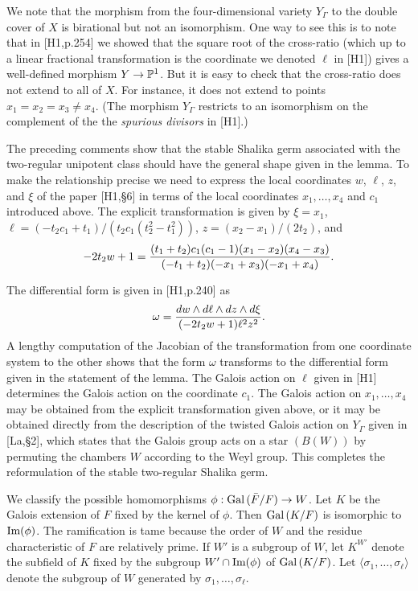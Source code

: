 We note that the morphism from the four-dimensional variety $Y_\Gamma$ to
the double cover of $X$ is birational but not an isomorphism.  One
way to see this is to note that in [H1,p.254] we showed that the 
square root of the cross-ratio
(which up to a linear fractional transformation is the coordinate
we denoted $\ell$ in [H1]) gives a well-defined morphism $Y\to\P^1$.
But it is easy to check that the cross-ratio does not extend to all of
$X$.  For instance, it does not extend to points $x_1=x_2=x_3\ne x_4$.
(The morphism $Y_\Gamma$ restricts to an isomorphism
on the complement of the
the {\it spurious divisors} in [H1].)

The preceding comments show
that the stable Shalika germ associated with the two-regular
unipotent class should have the general shape given in the lemma.
To make the relationship precise we need to express the local
coordinates $w$, $\ell$, $z$, and $\xi$ of the paper [H1,\S6] in terms
of the local coordinates $x_1,\ldots,x_4$ and $c_1$ introduced above.
The explicit transformation is given by $\xi=x_1$, $\ell =
(-t_2 c_1 + t_1)/(t_2 c_1 (t_2^2-t_1^2))$, $z= (x_2-x_1)/(2 t_2)$,
and 
$$-2 t_2 w + 1 = {(t_1+t_2) c_1 (c_1-1) (x_1-x_2) (x_4-x_3)  
                \over (-t_1+t_2)(-x_1+x_3)(-x_1+x_4)}.$$

The differential form is given in [H1,p.240] as
$$\omega = {dw\wedge d\ell\wedge dz\wedge d\xi\over
 (-2t_2 w + 1) \ell^2 z^2}.$$
A lengthy computation of the Jacobian of the transformation
from one coordinate system to the other shows that the form $\omega$
transforms to the differential form given in the statement of the lemma.
The Galois action on $\ell$ given in [H1] determines the Galois action
on the coordinate $c_1$.  The Galois action on $x_1,\ldots,x_4$ may
be obtained from the explicit transformation given above, or it may
be obtained directly from the description of the twisted Galois action
on $Y_\Gamma$ given in [La,\S2], 
which states that the Galois group acts on a 
star $(B(W))$ by permuting the chambers $W$ according to the Weyl group.
This completes the reformulation of the
stable two-regular Shalika germ.\hfill \x

\bigskip
We classify the possible homomorphisms $\phi:\Gal(\bF/F)\to W$.
Let $K$
be the Galois extension of $F$ fixed by the kernel of $\phi$.
Then $\Gal(K/F)$ is isomorphic to $\Ima(\phi)$.
The ramification is tame because the order of $W$ and the
residue characteristic of $F$ are relatively prime.  
  If $W'$
is a subgroup of $W$, let $K^{W'}$ denote the subfield of $K$
fixed by the subgroup 
$W'\cap \Ima(\phi)$ of $\Gal(K/F)$.  Let $\langle\sigma_1,\ldots,\sigma_\ell\rangle
$ denote the subgroup of $W$ generated by $\sigma_1,\ldots,\sigma_\ell$.

